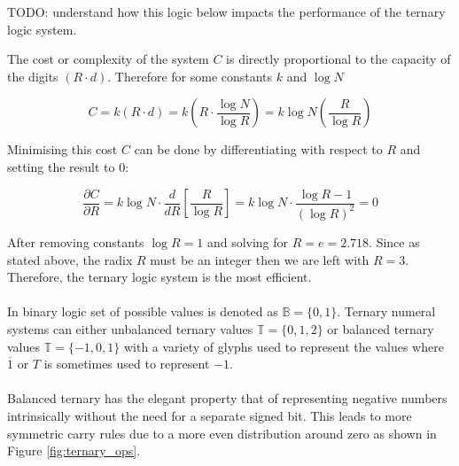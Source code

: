 \documentclass[12pt]{article}
\begin{document}
TODO: understand how this logic below impacts the performance of the ternary logic system.

The cost or complexity of the system $C$ is directly proportional to the capacity of the digits $(R \cdot d)$.
Therefore for some constants $k$ and $\log N$

\begin{equation}
  C = k(R \cdot d) = k \left( R \cdot \frac{\log N}{\log R} \right) = k \log N \left(\frac{R}{\log R}\right)
\end{equation}

Minimising this cost $C$ can be done by differentiating with respect to $R$ and setting the result to $0$:

\begin{equation}
  \frac{\partial C}{\partial R} = 
  k\log N\cdot\frac{d}{dR}\left[\frac{R}{\log R}\right] = 
  k\log N\cdot \frac{\log R -1}{(\log R)^2} = 0
\end{equation}

After removing constants $\log R = 1$ and solving for $R = e = 2.718$. Since as stated above, the radix $R$ must be an 
integer then we are left with $R = 3$. Therefore, the ternary logic system is the most efficient.\\
\\
In binary logic set of possible values is denoted as $\mathbb{B} = \{0, 1\}$. Ternary numeral systems can either unbalanced 
ternary values $\mathbb{T} = \{0, 1, 2\}$ or balanced ternary values $\mathbb{T} = \{-1, 0, 1\}$ with 
a variety of glyphs used to represent the values where $\overline{1}$ or $T$ is sometimes used to represent $-1$.\\
\\
Balanced ternary has the elegant property that of representing negative numbers intrinsically without the need for a 
separate signed bit. This leads to more symmetric carry rules due to a more even distribution around zero as shown in 
Figure \ref{fig:ternary_ops}.\\
\end{document}
